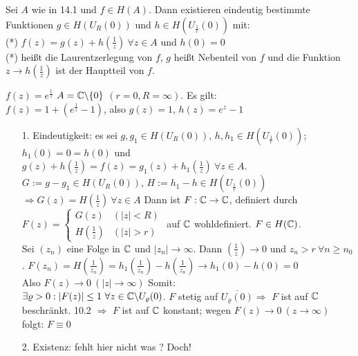 \documentclass[a4paper,twoside,DIV15,BCOR12mm]{scrbook}
\begin{document}
\begin{satz} [Laurententwicklung]
  Sei $A$ wie in 14.1 und $f \in H(A)$. Dann existieren eindeutig bestimmte Funktionen $g \in H(U_R(0))$ und $h \in H(U_{\frac{1}{r}}(0))$ mit: \\
  (*) $f(z) = g(z) + h(\frac{1}{z})\ \forall z \in A$ und $h(0) = 0$ \\
  (*) heißt die Laurentzerlegung von $f$, $g$ heißt Nebenteil von $f$ und die Funktion $ z \rightarrow h(\frac{1}{z})$ ist der Hauptteil von $f$. 
\end{satz}

\begin{beispiel}
  $f(z) = e^{\frac{1}{z}}$ $A = \mathbb{C} \backslash \{0\}$ $(r = 0, R = \infty)$. Es gilt: \\
  $f(z) = 1 + (  e^{\frac{1}{z}} - 1 )$, also $g(z) = 1$, $h(z) = e^z -1 $
\end{beispiel}

\begin{beweis}
  \begin{itemize}
    \item[ 1. ] Eindeutigkeit: es sei $g, g_1 \in H(U_R(0))$, $h, h_1 \in H(U_{\frac{1}{r}}(0))$;
	$h_1(0) = 0 = h(0)$ und $g(z) + h(\frac{1}{z}) = f(z) = g_1(z) + h_1(\frac{1}{z})\ \forall z \in A$.\\
	$G := g - g_1 \in H(U_R(0))$, $H:= h_1 - h \in  H(U_{\frac{1}{r}}(0))$ \\
	$\Rightarrow G(z) = H(\frac{1}{z}) \ \forall z \in A$
	Dann ist $F:\mathbb{C} \rightarrow \mathbb{C}$, definiert durch \\
	$F(z) = \begin{cases} G(z) & (|z| < R) \\ H(\frac1z) & (|z| > r)\end{cases}$ \; auf $\mathbb{C}$ wohldefiniert. $F \in H(\mathbb{C})$. \\
	Sei $(z_n)$ eine Folge in $\mathbb{C}$ und $|z_n| \rightarrow \infty$. Dann $(\frac{1}{z}) \rightarrow 0$ und
	$z_n > r \ \forall n \ge n_0$. $F(z_n) = H(\frac{1}{z_n}) = h_1(\frac{1}{z_n}) - h(\frac{1}{z_n}) \rightarrow h_1(0) - h(0) = 0$\\
	Also $F(z) \rightarrow 0 \ (|z| \rightarrow \infty)$ Somit: \\
	$\exists \varrho > 0: |F(z)| \le 1 \ \forall z \in \MdC \backslash U_{\varrho}(0)$. $F$ stetig auf $ \overline{U_{\varrho}(0)} \Rightarrow$
	$F$ ist auf $\mathbb{C}$ beschränkt. 10.2 $\Rightarrow$ $F$ ist auf $\mathbb{C}$ konstant; wegen 
	$F(z) \rightarrow 0 \ (z \rightarrow \infty)$ folgt: $F \equiv 0$
    \item[ 2. ] Existenz: fehlt hier nicht was ? Doch! 
  \end{itemize}
\end{beweis}
\end{document}

